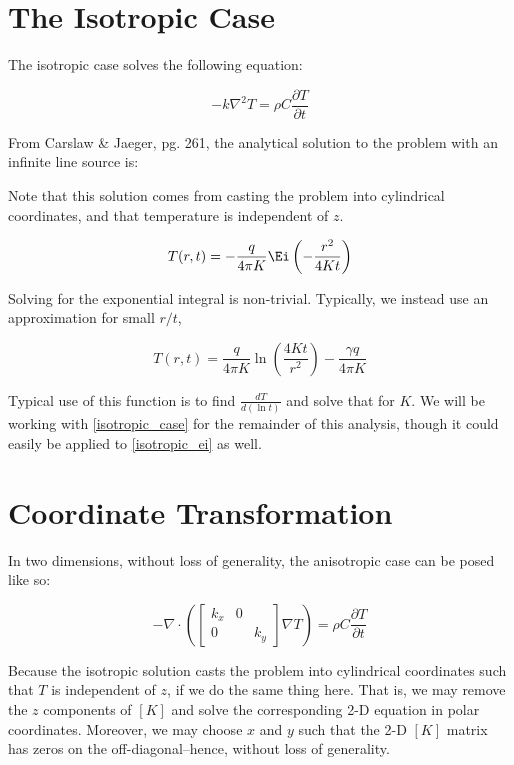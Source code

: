 \section{The Isotropic Case}

The isotropic case solves the following equation:

\begin{equation*}
-k\nabla^2 T = \rho C\frac{\partial T}{\partial t}
\end{equation*}

From Carslaw \& Jaeger, pg. 261, the analytical solution to the problem with an infinite line source is:

Note that this solution comes from casting the problem into cylindrical coordinates, and that temperature is independent of \(z\).

\begin{equation}
\label{isotropic_ei}
T(r,t) = - \frac{q}{4\pi K}\Ei\left(-\frac{r^2}{4Kt}\right)
\end{equation}

Solving for the exponential integral is non-trivial.  Typically, we instead use an approximation for small \(r/t\),

\begin{equation}
\label{isotropic_case}
T(r,t) = \frac{q}{4\pi K}\ln\left(\frac{4Kt}{r^2}\right) - \frac{\gamma q}{4\pi K}
\end{equation}

Typical use of this function is to find \(\frac{dT}{d(\ln t)}\) and solve that for \(K\). We will be working with \ref{isotropic_case} for the remainder of this analysis, though it could easily be applied to \ref{isotropic_ei} as well.

\section{Coordinate Transformation}

In two dimensions, without loss of generality, the anisotropic case can be posed like so:

\begin{equation}
-\nabla \cdot \left(\begin{bmatrix}k_x & 0\\ 0 && k_y\end{bmatrix}\nabla T \right)= \rho C\frac{\partial T}{\partial t}
\end{equation}

Because the isotropic solution casts the problem into cylindrical coordinates such that \(T\) is independent of \(z\), if we do the same thing here. That is, we may remove the \(z\) components of \([K]\) and solve the corresponding 2-D equation in polar coordinates. Moreover, we may choose \(x\) and \(y\) such that the 2-D \([K]\) matrix has zeros on the off-diagonal--hence, without loss of generality.


